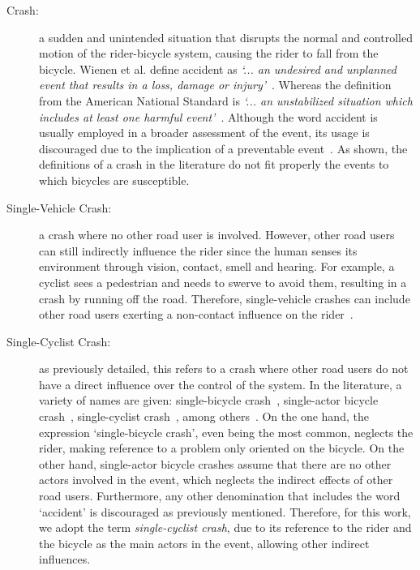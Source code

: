 \documentclass{article}
\begin{document}
\begin{description}
    \item [Crash:] a sudden and unintended situation that disrupts the normal and controlled motion of the rider-bicycle system, causing the rider to fall from the bicycle.
    Wienen et al. define accident as \textit{`... an undesired and unplanned event that results in a loss, damage or injury'}~\cite{Wie18}.
    Whereas the definition from the American National Standard is \textit{`... an unstabilized situation which includes at least one harmful event'}~\cite{Ame17a}. 
    Although the word accident is usually employed in a broader assessment of the event, its usage is discouraged due to the implication of a preventable event~\cite{Dav01}.
    As shown, the definitions of a crash in the literature do not fit properly the events to which bicycles are susceptible. 
    
    
    \item [Single-Vehicle Crash:] a crash where no other road user is involved.
    However, other road users can still indirectly influence the rider since the human senses its environment through vision, contact, smell and hearing.
    For example, a cyclist sees a pedestrian and needs to swerve to avoid them, resulting in a crash by running off the road.
    Therefore, single-vehicle crashes can include other road users exerting a non-contact influence on the rider~\cite{Orm09}.
    
    
    \item [Single-Cyclist Crash:] as previously detailed, this refers to a crash where other road users do not have a direct influence over the control of the system.
    In the literature, a variety of names are given: single-bicycle crash~\cite{Alg22, Bec19, Boe17, Gil23a, Møl21, Ohl19, Sch12, Sch15, Sch17, Sch18a, Twi13, Utr20, Utr23, Utr23a, Van16}, single-actor bicycle crash~\cite{Ali23}, single-cyclist crash~\cite{Gil21, Gil21a}, among others~\cite{Bou13, Bou16, Her18, Sch21}.
    On the one hand, the expression `single-bicycle crash', even being the most common, neglects the rider, making reference to a problem only oriented on the bicycle.
    On the other hand, single-actor bicycle crashes assume that there are no other actors involved in the event, which neglects the indirect effects of other road users.
    Furthermore, any other denomination that includes the word `accident' is discouraged as previously mentioned.
    Therefore, for this work, we adopt the term \textit{single-cyclist crash}, due to its reference to the rider and the bicycle as the main actors in the event, allowing other indirect influences.
\end{description}
\end{document}
